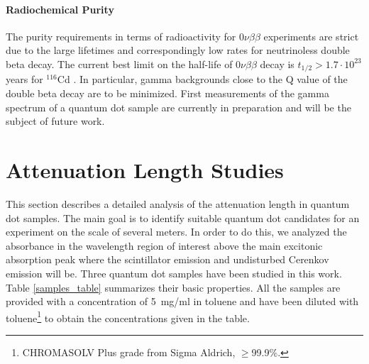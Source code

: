\documentclass[cits]{JINST}
\begin{document}
\paragraph{Radiochemical Purity}
The purity requirements in terms of radioactivity for 0$\nu\beta\beta$ experiments are strict due to the large lifetimes and correspondingly low rates for neutrinoless double beta decay. The current best limit on the half-life of 0$\nu\beta\beta$ decay is $t_{1/2}>1.7\cdot10^{23}$ years for $^{116}$Cd \cite{solotvina}. In particular, gamma backgrounds close to the Q value of the double beta decay are to be minimized. First measurements of the gamma spectrum of a quantum dot sample are currently in preparation and will be the subject of future work.   

\section{Attenuation Length Studies}\label{Attenuation_length_section}
This section describes a detailed analysis of the attenuation length in quantum dot samples. The main goal is to identify suitable quantum dot candidates for an experiment on the scale of several meters. In order to do this, we analyzed the absorbance in the wavelength region of interest above the main excitonic absorption peak where the scintillator emission and undisturbed Cerenkov emission will be. Three quantum dot samples have been studied in this work. Table \ref{samples_table} summarizes their basic properties. All the samples are provided with a concentration of 5~mg/ml in toluene and have been diluted with toluene\footnote{CHROMASOLV\textsuperscript{\textregistered} Plus grade from Sigma Aldrich, $\geq$99.9\%.} to obtain the concentrations given in the table. 
\end{document}

